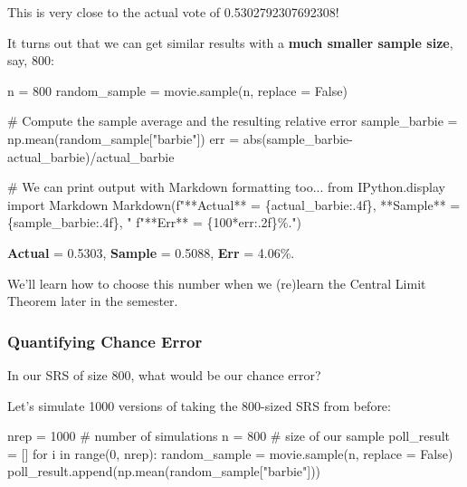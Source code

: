 \documentclass[
  letterpaper,
  DIV=11,
  numbers=noendperiod]{scrreprt}
\newenvironment{Shaded}{\begin{snugshade}}{\end{snugshade}}
\newcommand{\BuiltInTok}[1]{\textcolor[rgb]{0.00,0.23,0.31}{#1}}
\newcommand{\CommentTok}[1]{\textcolor[rgb]{0.37,0.37,0.37}{#1}}
\newcommand{\ControlFlowTok}[1]{\textcolor[rgb]{0.00,0.23,0.31}{#1}}
\newcommand{\DecValTok}[1]{\textcolor[rgb]{0.68,0.00,0.00}{#1}}
\newcommand{\ImportTok}[1]{\textcolor[rgb]{0.00,0.46,0.62}{#1}}
\newcommand{\KeywordTok}[1]{\textcolor[rgb]{0.00,0.23,0.31}{#1}}
\newcommand{\NormalTok}[1]{\textcolor[rgb]{0.00,0.23,0.31}{#1}}
\newcommand{\OperatorTok}[1]{\textcolor[rgb]{0.37,0.37,0.37}{#1}}
\newcommand{\SpecialCharTok}[1]{\textcolor[rgb]{0.37,0.37,0.37}{#1}}
\newcommand{\SpecialStringTok}[1]{\textcolor[rgb]{0.13,0.47,0.30}{#1}}
\newcommand{\StringTok}[1]{\textcolor[rgb]{0.13,0.47,0.30}{#1}}
\newcommand{\VariableTok}[1]{\textcolor[rgb]{0.07,0.07,0.07}{#1}}
\begin{document}
This is very close to the actual vote of 0.5302792307692308!

It turns out that we can get similar results with a \textbf{much smaller
sample size}, say, 800:

\begin{Shaded}
\begin{Highlighting}[]
\NormalTok{n }\OperatorTok{=} \DecValTok{800}
\NormalTok{random\_sample }\OperatorTok{=}\NormalTok{ movie.sample(n, replace }\OperatorTok{=} \VariableTok{False}\NormalTok{)}

\CommentTok{\# Compute the sample average and the resulting relative error}
\NormalTok{sample\_barbie }\OperatorTok{=}\NormalTok{ np.mean(random\_sample[}\StringTok{"barbie"}\NormalTok{])}
\NormalTok{err }\OperatorTok{=} \BuiltInTok{abs}\NormalTok{(sample\_barbie}\OperatorTok{{-}}\NormalTok{actual\_barbie)}\OperatorTok{/}\NormalTok{actual\_barbie}

\CommentTok{\# We can print output with Markdown formatting too...}
\ImportTok{from}\NormalTok{ IPython.display }\ImportTok{import}\NormalTok{ Markdown}
\NormalTok{Markdown(}\SpecialStringTok{f"**Actual** = }\SpecialCharTok{\{}\NormalTok{actual\_barbie}\SpecialCharTok{:.4f\}}\SpecialStringTok{, **Sample** = }\SpecialCharTok{\{}\NormalTok{sample\_barbie}\SpecialCharTok{:.4f\}}\SpecialStringTok{, "}
         \SpecialStringTok{f"**Err** = }\SpecialCharTok{\{}\DecValTok{100}\OperatorTok{*}\NormalTok{err}\SpecialCharTok{:.2f\}}\SpecialStringTok{\%."}\NormalTok{)}
\end{Highlighting}
\end{Shaded}

\textbf{Actual} = 0.5303, \textbf{Sample} = 0.5088, \textbf{Err} =
4.06\%.

We'll learn how to choose this number when we (re)learn the Central
Limit Theorem later in the semester.

\subsubsection{Quantifying Chance Error}\label{quantifying-chance-error}

In our SRS of size 800, what would be our chance error?

Let's simulate 1000 versions of taking the 800-sized SRS from before:

\begin{Shaded}
\begin{Highlighting}[]
\NormalTok{nrep }\OperatorTok{=} \DecValTok{1000}   \CommentTok{\# number of simulations}
\NormalTok{n }\OperatorTok{=} \DecValTok{800}       \CommentTok{\# size of our sample}
\NormalTok{poll\_result }\OperatorTok{=}\NormalTok{ []}
\ControlFlowTok{for}\NormalTok{ i }\KeywordTok{in} \BuiltInTok{range}\NormalTok{(}\DecValTok{0}\NormalTok{, nrep):}
\NormalTok{    random\_sample }\OperatorTok{=}\NormalTok{ movie.sample(n, replace }\OperatorTok{=} \VariableTok{False}\NormalTok{)}
\NormalTok{    poll\_result.append(np.mean(random\_sample[}\StringTok{"barbie"}\NormalTok{]))}
\end{Highlighting}
\end{Shaded}
\end{document}
